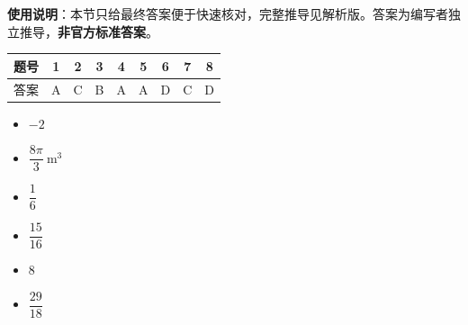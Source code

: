 
\begin{gknotice}
\textbf{使用说明}：本节只给最终答案便于快速核对，完整推导见解析版。答案为编写者独立推导，\textbf{非官方标准答案}。
\end{gknotice}

\begin{center}\begin{tabular}{ccccccccc}
\toprule
题号 & 1 & 2 & 3 & 4 & 5 & 6 & 7 & 8 \\
\midrule
答案 & A & C & B & A & A & D & C & D \\
\bottomrule
\end{tabular}\end{center}

\begin{itemize}[leftmargin=2.6em]
  \item[\textbf{9.}] \(-2\)
  \item[\textbf{10.}] \(\dfrac{8\pi}{3}\ \mathrm{m}^3\)
  \item[\textbf{11.}] \(\dfrac{1}{6}\)
  \item[\textbf{12.}] \(\dfrac{15}{16}\)
  \item[\textbf{13.}] \(8\)
  \item[\textbf{14.}] \(\dfrac{29}{18}\)
\end{itemize}

